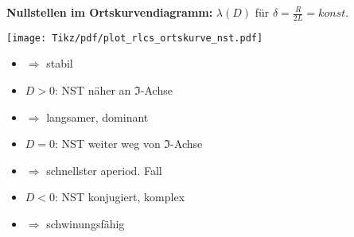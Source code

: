 \begin{frame}[t]
{\textbf{Nullstellen im Ortskurvendiagramm:} $\lambda(D)$ für $\delta=\frac{R}{2L}=konst.$ \vspace{2pt}

\begin{minipage}{\textwidth}\centering
    \begin{minipage}{0.4\textwidth}\centering
        \texttt{[image: Tikz/pdf/plot\_rlcs\_ortskurve\_nst.pdf]}%
    \end{minipage}%
    \begin{minipage}{0.56\textwidth}\centering
        \begin{itemize}
            \item[]  $\Rightarrow$ stabil
            \item[] $D>0$: NST näher an $\Im$-Achse
            \item[] \hspace{2cm} $\Rightarrow$ langsamer, dominant
            \item[] $D=0$: NST weiter weg von $\Im$-Achse
            \item[] \hspace{2cm} $\Rightarrow$ schnellster aperiod. Fall
            \item[] $D<0$: NST konjugiert, komplex
            \item[] \hspace{2cm} $\Rightarrow$ schwinungsfähig
        \end{itemize}
    \end{minipage}
\end{minipage}
}%
\end{frame}

\newpage%

